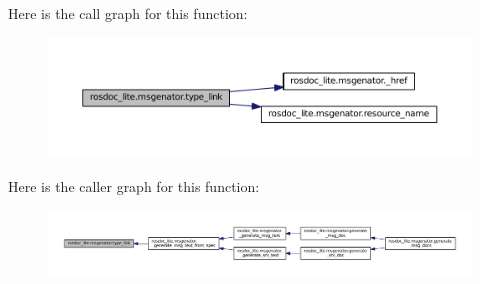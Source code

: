 Here is the call graph for this function\+:
\nopagebreak
\begin{figure}[H]
\begin{center}
\leavevmode
\includegraphics[width=350pt]{namespacerosdoc__lite_1_1msgenator_ae7b2ebaabcca635cf4572218382dda21_cgraph}
\end{center}
\end{figure}




Here is the caller graph for this function\+:
\nopagebreak
\begin{figure}[H]
\begin{center}
\leavevmode
\includegraphics[width=350pt]{namespacerosdoc__lite_1_1msgenator_ae7b2ebaabcca635cf4572218382dda21_icgraph}
\end{center}
\end{figure}


